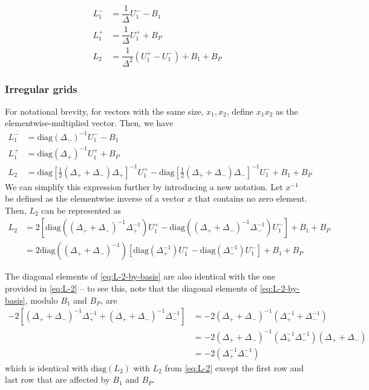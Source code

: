 \documentclass[11pt]{article}
\begin{document}
\begin{align}
L_1^{-} &= \dfrac{1}{\Delta} U_1^{-} - B_1 \\
L_1^{+} &= \dfrac{1}{\Delta} U_1^{+} + B_P \\
L_2 &= \dfrac{1}{\Delta^2} (U_1^+ - U_1^-) + B_1 + B_P
\end{align}

\subsubsection{Irregular grids}
For notational brevity, for vectors with the same size, $x_1, x_2$, define $x_1 x_2$ as the elementwise-multiplied vector. Then, we have
\begin{align}
L_1^{-} &= \text{diag}(\Delta_{-} )^{-1} U_1^{-} - B_1 \\
L_1^{+} &= \text{diag}(\Delta_{+} )^{-1} U_1^{+} + B_P \\
L_2 &= \text{diag} \left[ \frac{1}{2} ( \Delta_+ + \Delta_- ) \Delta_+ \right]^{-1}  U_1^{+} - 
 \text{diag} \left[ \frac{1}{2} ( \Delta_+ + \Delta_- ) \Delta_- \right]^{-1}  U_1^{-} 
+ B_1 + B_P 
\end{align}
We can simplify this expression further by introducing a new notation. Let $x^{-1}$ be defined as the elementwise inverse of a vector $x$ that contains no zero element. Then, $L_2$ can be represented as
\begin{align}
L_2 &=
2\left[ \text{diag} \left( ( \Delta_+ + \Delta_- )^{-1} \Delta_+^{-1} \right) U_1^{+} - 
\text{diag} \left( ( \Delta_+ + \Delta_- )^{-1} \Delta_-^{-1} \right) U_1^{-}  \right]
+ B_1 + B_P \\ \label{eq:L-2-by-basis}
&= 2 \text{diag} \left( ( \Delta_+ + \Delta_- )^{-1} \right) \left[ \text{diag} \left(  \Delta_+^{-1} \right) U_1^{+} - 
\text{diag} \left(  \Delta_-^{-1} \right) U_1^{-}  \right]
+ B_1 + B_P
\end{align}


The diagonal elements of \eqref{eq:L-2-by-basis} are also identical with the one provided in \eqref{eq:L-2} -- to see this, note that the diagonal elements of \eqref{eq:L-2-by-basis}, modulo $B_1$ and $B_P$, are
\begin{align}
-2 \left[ (\Delta_+ + \Delta_-)^{-1} \Delta_+^{-1} + (\Delta_+ + \Delta_-)^{-1} \Delta_-^{-1} \right] &= -2 (\Delta_+ + \Delta_-)^{-1}  ( \Delta_+^{-1} + \Delta_-^{-1} ) \\
&= -2(\Delta_+ + \Delta_-)^{-1} (\Delta_+^{-1} \Delta_-^{-1}) (\Delta_+ + \Delta_- )  \\
&= -2 (\Delta_+^{-1} \Delta_-^{-1})
\end{align}
which is identical with $\text{diag} (L_2)$ with $L_2$ from \eqref{eq:L-2} except the first row and last row that are affected by $B_1$ and $B_P$.


\end{document}
